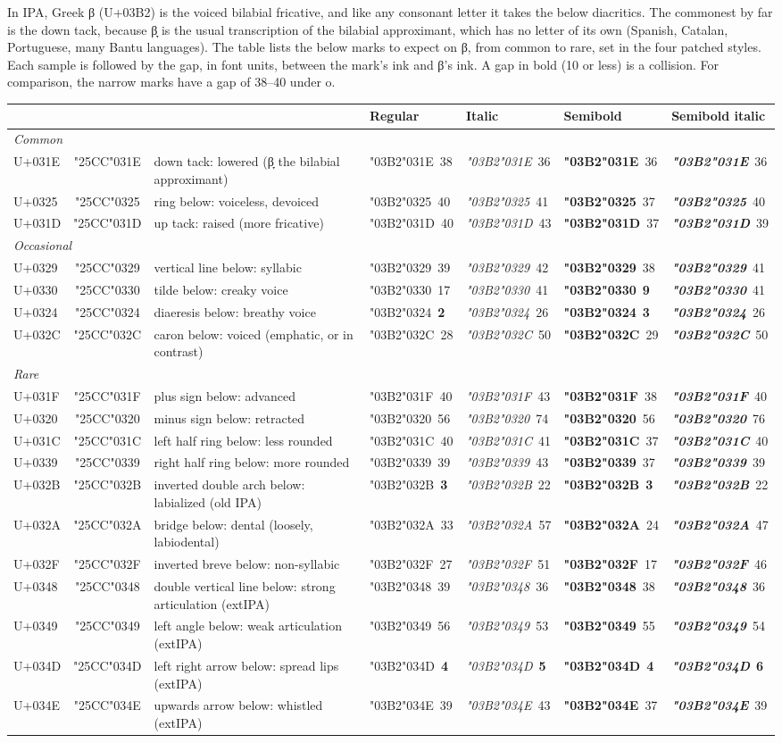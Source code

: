\documentclass[landscape]{article}
\begin{document}
\newcommand{\Bcell}[3]{{\LibertinusSerifPatch#1\Large\char"03B2\char"#2}~{\footnotesize#3}}
\newcommand{\Bup}{\upshape\mdseries}
\newcommand{\Bit}{\itshape\mdseries}
\newcommand{\Bbf}{\upshape\bfseries}
\newcommand{\Bbi}{\itshape\bfseries}
\newcommand{\Bhit}[1]{\textbf{#1}}   %
\newcommand{\Brow}[7]{U+#1 & \char"25CC\char"#1 & #2 & \Bcell{\Bup}{#1}{#3} & \Bcell{\Bit}{#1}{#4} & \Bcell{\Bbf}{#1}{#5} & \Bcell{\Bbi}{#1}{#6} \\}
\newcommand{\markat}[3]{\kern#1\raisebox{#2}{#3}\kern-#1}

In IPA, Greek β (U+03B2) is the voiced bilabial fricative, and like any consonant letter it takes the below diacritics.
The commonest by far is the down tack, because β̞ is the usual transcription of the bilabial approximant,
which has no letter of its own (Spanish, Catalan, Portuguese, many Bantu languages).
The table lists the below marks to expect on β, from common to rare,
set in the four patched styles. Each sample is followed by the gap,
in font units, between the mark's ink and β's ink. A gap in bold (10 or less) is a collision.
For comparison, the narrow marks have a gap of 38--40 under o.

\medskip
\renewcommand{\arraystretch}{1.5}
\begin{tabular}{l c l l l l l}
	& & & Regular & Italic & Semibold & Semibold italic \\ \hline
	\multicolumn{7}{l}{\textit{Common}} \\
	\Brow{031E}{down tack: lowered (β̞ the bilabial approximant)}{38}{36}{36}{36}{}
	\Brow{0325}{ring below: voiceless, devoiced}{40}{41}{37}{40}{}
	\Brow{031D}{up tack: raised (more fricative)}{40}{43}{37}{39}{}
	\multicolumn{7}{l}{\textit{Occasional}} \\
	\Brow{0329}{vertical line below: syllabic}{39}{42}{38}{41}{}
	\Brow{0330}{tilde below: creaky voice}{17}{41}{\Bhit{9}}{41}{}
	\Brow{0324}{diaeresis below: breathy voice}{\Bhit{2}}{26}{\Bhit{3}}{26}{}
	\Brow{032C}{caron below: voiced (emphatic, or in contrast)}{28}{50}{29}{50}{}
	\multicolumn{7}{l}{\textit{Rare}} \\
	\Brow{031F}{plus sign below: advanced}{40}{43}{38}{40}{}
	\Brow{0320}{minus sign below: retracted}{56}{74}{56}{76}{}
	\Brow{031C}{left half ring below: less rounded}{40}{41}{37}{40}{}
	\Brow{0339}{right half ring below: more rounded}{39}{43}{37}{39}{}
	\Brow{032B}{inverted double arch below: labialized (old IPA)}{\Bhit{3}}{22}{\Bhit{3}}{22}{}
	\Brow{032A}{bridge below: dental (loosely, labiodental)}{33}{57}{24}{47}{}
	\Brow{032F}{inverted breve below: non-syllabic}{27}{51}{17}{46}{}
	\Brow{0348}{double vertical line below: strong articulation (extIPA)}{39}{36}{38}{36}{}
	\Brow{0349}{left angle below: weak articulation (extIPA)}{56}{53}{55}{54}{}
	\Brow{034D}{left right arrow below: spread lips (extIPA)}{\Bhit{4}}{\Bhit{5}}{\Bhit{4}}{\Bhit{6}}{}
	\Brow{034E}{upwards arrow below: whistled (extIPA)}{39}{43}{37}{39}{}
\end{tabular}
\renewcommand{\arraystretch}{1}
\end{document}

